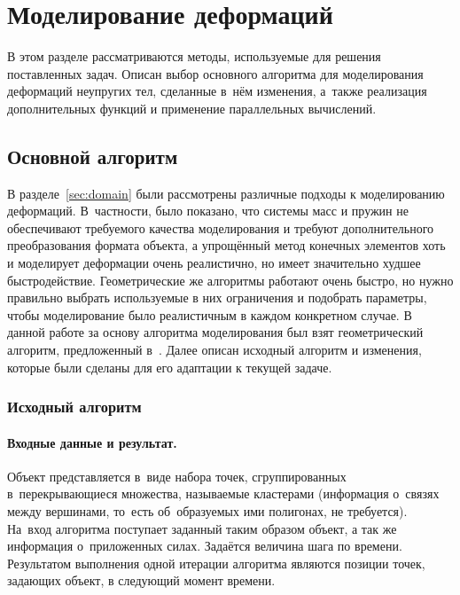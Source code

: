\documentclass[a4paper, 14pt, titlepage]{extarticle}
\let\oldsection\section
\renewcommand{\section}{\newpage\oldsection}
\begin{document}
  \section{Моделирование деформаций}

    В этом разделе рассматриваются методы, используемые для решения поставленных задач. Описан выбор
    основного алгоритма для моделирования деформаций неупругих тел, сделанные в~нём изменения,
    а~также реализация дополнительных функций и применение параллельных вычислений.

    \subsection{Основной алгоритм}\label{ssec:basic_algorithm}

      В разделе~\ref{sec:domain} были рассмотрены различные подходы к моделированию деформаций.
      В~частности, было показано, что системы масс и пружин не обеспечивают требуемого качества
      моделирования и требуют дополнительного преобразования формата объекта, а упрощённый метод конечных элементов
      хоть и моделирует деформации очень реалистично, но имеет значительно худшее быстродействие.
      Геометрические же алгоритмы работают очень быстро, но нужно правильно выбрать используемые в
      них ограничения и подобрать параметры, чтобы моделирование было реалистичным в каждом
      конкретном случае. В данной работе за основу алгоритма моделирования был взят геометрический
      алгоритм, предложенный в~\cite{mueller-meshless}. Далее описан исходный алгоритм и изменения,
      которые были сделаны для его адаптации к текущей задаче.

      \subsubsection{Исходный алгоритм}\label{sssec:original_algorithm}

        \paragraph{Входные данные и результат.} Объект представляется в~виде набора точек,
        сгруппированных в~перекрывающиеся множества, называемые кластерами
        (информация о~связях между вершинами, то~есть об~образуемых ими полигонах, не требуется).
        На~вход алгоритма поступает заданный таким образом объект, а так же информация о~приложенных
        силах. Задаётся величина шага по времени. Результатом выполнения одной итерации алгоритма
        являются позиции точек, задающих объект, в следующий момент времени.
\end{document}
